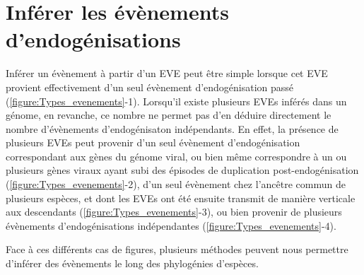 \section{Inférer les évènements d'endogénisations}

Inférer un évènement à partir d'un EVE peut être simple lorsque cet EVE provient effectivement d'un seul évènement d'endogénisation passé (\figurename{\ref{figure:Types_evenements}}-1). Lorsqu'il existe plusieurs EVEs inférés dans un génome, en revanche, ce nombre ne permet pas d'en déduire directement le nombre d'évènements d'endogénisaton indépendants. En effet, la présence de plusieurs EVEs peut provenir d'un seul évènement d'endogénisation correspondant aux gènes du génome viral, ou bien même correspondre à un ou plusieurs gènes viraux ayant subi des épisodes de duplication post-endogénisation (\figurename{\ref{figure:Types_evenements}}-2), d'un seul évènement chez l'ancêtre commun de plusieurs espèces, et dont les EVEs ont été ensuite transmit de manière verticale aux descendants (\figurename{\ref{figure:Types_evenements}}-3), ou bien provenir de plusieurs évènements d'endogénisations indépendantes (\figurename{\ref{figure:Types_evenements}}-4).

Face à ces différents cas de figures, plusieurs méthodes peuvent nous permettre d'inférer des évènements le long des phylogénies d'espèces.

